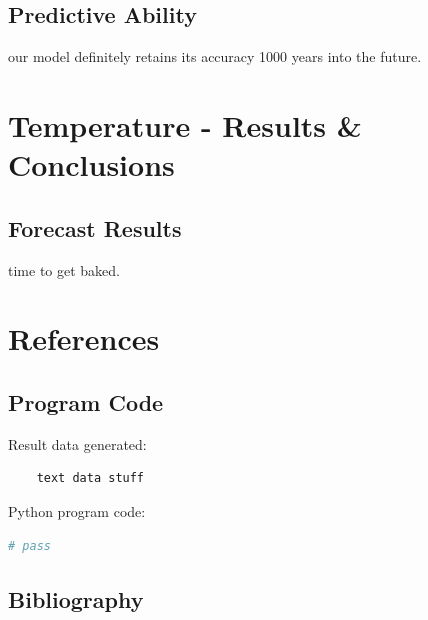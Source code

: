\documentclass{mcmthesis}
\begin{document}
    \subsection{Predictive Ability}
    our model definitely retains its accuracy 1000 years into the future.



    \section{Temperature - Results \& Conclusions}

    \subsection{Forecast Results}
    time to get baked.



    \section{References}

    \subsection{Program Code}
    \noindent Result data generated:
    \begin{verbatim}
    text data stuff

    \end{verbatim}

    \noindent Python program code:
    \begin{lstlisting}[language=Python]
        # pass

    \end{lstlisting}


    \subsection{Bibliography}
\end{document}
